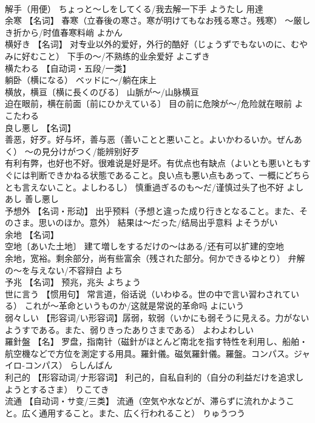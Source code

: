 \documentclass[8pt]{extreport}
\begin{document}
\begin{CJK}{UTF8}{min}
\\	解手（用便） ちょっと～しをしてくる/我去解一下手	ようたし	用達
\\	余寒	【名词】 春寒（立春後の寒さ。寒が明けてもなお残る寒さ。残寒） ～厳しき折から/时值春寒料峭	よかん	
\\	横好き	【名词】 对专业以外的爱好，外行的酷好（じょうずでもないのに、むやみに好むこと） 下手の～/不熟练的业余爱好	よこずき	
\\	横たわる	【自动词・五段/一类】 
\\	躺卧（横になる） ベッドに～/躺在床上 
\\	横放，横亘〔横に長くのびる〕 山脈が～/山脉横亘 
\\	迫在眼前，横在前面〔前にひかえている〕 目の前に危険が～/危险就在眼前	よこたわる	
\\	良し悪し	【名词】 
\\	善恶，好歹。好与坏，善与恶（善いことと悪いこと。よいかわるいか。ぜんあく） ～の見分けがつく/能辨别好歹 
\\	有利有弊，也好也不好。很难说是好是坏。有优点也有缺点（よいとも悪いともすぐには判断できかねる状態であること。良い点も悪い点もあって、一概にどちらとも言えないこと。よしわるし） 慎重過ぎるのも～だ/谨慎过头了也不好	よしあし	善し悪し
\\	予想外	【名词・形动】 出乎预料（予想と違った成り行きとなること。また、そのさま。思いのほか。意外） 結果は～だった/结局出乎意料	よそうがい	
\\	余地	【名词】 
\\	空地〔あいた土地〕 建て増しをするだけの～はある/还有可以扩建的空地 
\\	余地，宽裕。剩余部分，尚有些富余（残された部分。何かできるゆとり） 弁解の～を与えない/不容辩白	よち	
\\	予兆	【名词】 预兆，兆头	よちょう	
\\	世に言う	【惯用句】 常言道，俗话说（いわゆる。世の中で言い習わされている） これが～革命というものか/这就是常说的革命吗	よにいう	
\\	弱々しい	【形容词/い形容词】孱弱，软弱（いかにも弱そうに見える。力がないようすである。また、弱りきったありさまである）	よわよわしい	
\\	羅針盤	【名】 罗盘，指南针（磁針がほとんど南北を指す特性を利用し、船舶・航空機などで方位を測定する用具。羅針儀。磁気羅針儀。羅盤。コンパス。ジャイロ‐コンパス）	らしんばん	
\\	利己的	【形容动词/ナ形容词】 利己的，自私自利的（自分の利益だけを追求しようとするさま）	りこてき	
\\	流通	【自动词・サ变/三类】 流通（空気や水などが、滞らずに流れかようこと。広く通用すること。また、広く行われること）	りゅうつう	

\end{CJK}
\end{document}
